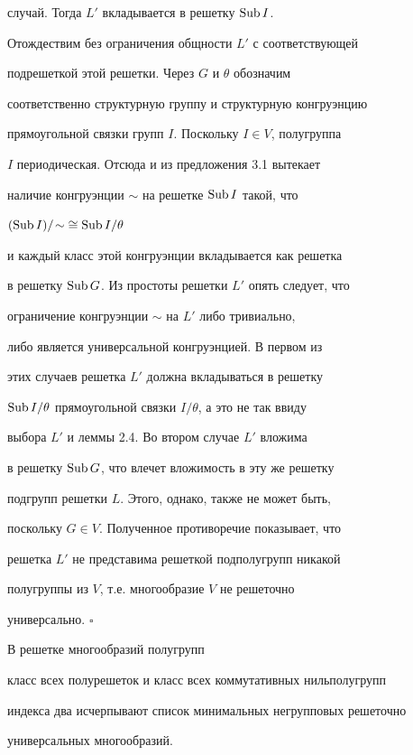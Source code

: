 случай. Тогда $L'$ вкладывается в решетку $\operatorname{Sub} I$.


Отождествим без ограничения общности $L'$ с соответствующей


подрешеткой этой решетки. Через $G$ и $\theta$ обозначим


соответственно структурную группу и структурную конгруэнцию


прямоугольной связки групп $I$. Поскольку $I \in V$, полугруппа


$I$ периодическая. Отсюда и из предложения 3.1 вытекает


наличие конгруэнции $\sim$ на решетке $\operatorname{Sub} I$ такой, что


$(\operatorname{Sub} I)/\!\sim \; \cong \operatorname{Sub} I/\theta$


и каждый класс этой конгруэнции вкладывается как решетка


в решетку $\operatorname{Sub} G$. Из простоты решетки $L'$ опять следует, что


ограничение конгруэнции $\sim$ на $L'$ либо тривиально,


либо является универсальной конгруэнцией. В первом из


этих случаев решетка $L'$ должна вкладываться в решетку


$\operatorname{Sub} I/\theta$ прямоугольной связки $I/\theta$, а это не так ввиду


выбора $L'$ и леммы 2.4. Во втором случае $L'$ вложима


в решетку $\operatorname{Sub} G$, что влечет вложимость в эту же решетку


подгрупп решетки $L$. Этого, однако, также не может быть,


поскольку $G \in V$. Полученное противоречие показывает, что


решетка $L'$ не представима решеткой подполугрупп никакой


полугруппы из $V$, т.е. многообразие $V$ не решеточно


универсально. $\square$





\begin{cornonum} В решетке многообразий полугрупп


класс всех полурешеток и класс всех коммутативных нильполугрупп


индекса два исчерпывают список минимальных негрупповых решеточно


универсальных многообразий.


\end{cornonum}





